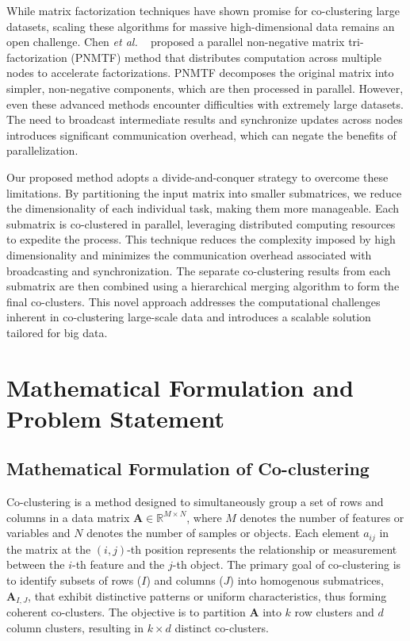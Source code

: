 \documentclass[journal]{IEEEtran}
\renewcommand{\cite}[1]{~\autocite{#1}}
\begin{document}
While matrix factorization techniques have shown promise for co-clustering large datasets, scaling these algorithms for massive high-dimensional data remains an open challenge. Chen \textit{et al.} \cite{chen2023ParallelNonNegativeMatrix} proposed a parallel non-negative matrix tri-factorization (PNMTF) method that distributes computation across multiple nodes to accelerate factorizations. PNMTF decomposes the original matrix into simpler, non-negative components, which are then processed in parallel. However, even these advanced methods encounter difficulties with extremely large datasets. The need to broadcast intermediate results and synchronize updates across nodes introduces significant communication overhead, which can negate the benefits of parallelization.

Our proposed method adopts a divide-and-conquer strategy to overcome these limitations. By partitioning the input matrix into smaller submatrices, we reduce the dimensionality of each individual task, making them more manageable. Each submatrix is co-clustered in parallel, leveraging distributed computing resources to expedite the process. This technique reduces the complexity imposed by high dimensionality and minimizes the communication overhead associated with broadcasting and synchronization. The separate co-clustering results from each submatrix are then combined using a hierarchical merging algorithm to form the final co-clusters. This novel approach addresses the computational challenges inherent in co-clustering large-scale data and introduces a scalable solution tailored for big data.

\section{Mathematical Formulation and Problem Statement}\label{sec:formula}
\subsection{Mathematical Formulation of Co-clustering}
Co-clustering is a method designed to simultaneously group a set of rows and columns in a data matrix $\mathbf{A} \in \mathbb{R}^{M \times N}$, where $M$ denotes the number of features or variables and $N$ denotes the number of samples or objects. Each element $a_{ij}$ in the matrix at the $(i, j)$-th position represents the relationship or measurement between the $i$-th feature and the $j$-th object. The primary goal of co-clustering is to identify subsets of rows ($I$) and columns ($J$) into homogenous submatrices, $\mathbf{A}_{I, J}$, that exhibit distinctive patterns or uniform characteristics, thus forming coherent co-clusters. The objective is to partition $\mathbf{A}$ into $k$ row clusters and $d$ column clusters, resulting in $k \times d$ distinct co-clusters.
\end{document}
